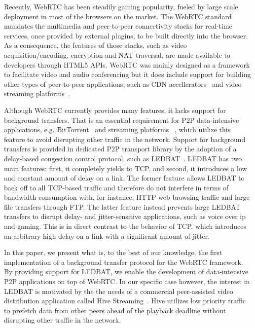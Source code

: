 \documentclass{sig-alternate}
\begin{document}

Recently, WebRTC has been steadily gaining popularity, fueled by large scale deployment in
most of the browsers on the market. The WebRTC standard mandates the multimedia and
peer-to-peer connectivity stacks for real-time services, once provided by external
plugins, to be built directly into the browser. As a consequence, the features of those
stacks, such as video acquisition/encoding, encryption and NAT traversal, are made
available to developers through HTML5 APIs. WebRTC was mainly designed as a framework to
facilitate video and audio conferencing but it does include support for building other
types of peer-to-peer applications, such as CDN accellerators~\cite{peerCDN} and video
streaming platforms~\cite{nurminen2013p2p}.


Although WebRTC currently provides many features, it lacks support for background
transfers. That is an essential requirement for P2P data-intensive applications, e.g.
BitTorrent~\cite{pouwelse2005bittorrent} and streaming platforms ~\cite{smoothcache}, which utilize
this feature to avoid disrupting other traffic in the network. Support for background
transfers is provided in dedicated P2P transport library by the adoption of a delay-based
congestion control protocol, such as LEDBAT~\cite{ledbat-rfc}. LEDBAT has two main
features: first, it completely yields to TCP, and second, it introduces a low and constant
amount of delay on a link. The former feature allows LEDBAT to back off to all TCP-based
traffic and therefore do not interfere in terms of bandwidth consumption with, for
instance, HTTP web browsing traffic and large file transfers through FTP. The latter
feature instead prevents large LEDBAT transfers to disrupt delay- and jitter-sensitive
applications, such as voice over ip and gaming. This is in direct contrast to the behavior
of TCP, which introduces an arbitrary high delay on a link with a significant amount of
jitter.

In this paper, we present what is, to the best of our knowledge, the first implementation
of a background transfer protocol for the WebRTC framework. By providing support for
LEDBAT, we enable the development of data-intensive P2P applications on top of
WebRTC. In our specific case however, the interest in LEDBAT is motivated by the the needs
of a commercial peer-assisted video distribution application called Hive
Streaming~\cite{hive}. Hive utilizes low priority traffic to prefetch data from other
peers ahead of the playback deadline without disrupting other traffic in the network.
\end{document}
